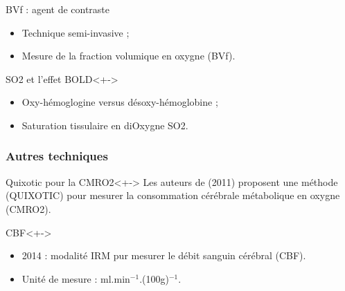 \begin{frame}
\begin{block}{BVf : agent de contraste}
\begin{itemize}
\item<+-> Technique semi-invasive ;
\item<+-> Mesure de la fraction volumique en oxygne (BVf).
\end{itemize}
\end{block}

\begin{block}{SO2 et l'effet BOLD}<+->
\begin{itemize}
\item<+-> Oxy-h\'emoglogine versus d\'esoxy-h\'emoglobine ;
\item<+-> Saturation tissulaire en diOxygne SO2.
\end{itemize}
\end{block}
\end{frame}

\begin{frame}
\frametitle{Autres techniques}
\begin{block}{Quixotic pour la CMRO2}<+->
Les auteurs de \cite{quixotic} (2011) proposent une m\'ethode (QUIXOTIC) pour mesurer la consommation c\'er\'ebrale m\'etabolique en oxygne (CMRO2).
\end{block}

\begin{block}{CBF}<+->
\begin{itemize}
\item<+-> 2014 : modalit\'e IRM pur mesurer le d\'ebit sanguin c\'er\'ebral (CBF).
\item<+-> Unit\'e de mesure : ml.min${}^{-1}$.(100g)${}^{-1}$.
\end{itemize}
\end{block}
\end{frame}


